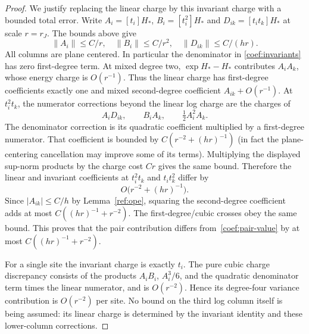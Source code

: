 \begin{proof}
We justify replacing the linear charge by this invariant charge with a
bounded total error.  Write $A_i=[t_i]H_*$, $B_i=[t_i^2]H_*$ and
$D_{ik}=[t_it_k]H_*$ at scale $r=r_J$.  The bounds above give
\[
 \|A_i\|\le C/r,\quad \|B_i\|\le C/r^2,\quad
 \|D_{ik}\|\le C/(hr).
\]
All columns are plane centered.  In particular the denominator in
\eqref{coef:invariants} has zero first-degree term.  At mixed degree two,
$\exp H_*-H_*$ contributes $A_iA_k$, whose energy charge is $O(r^{-1})$.
Thus the linear charge has first-degree coefficients exactly one and
mixed second-degree coefficient $A_{ik}+O(r^{-1})$.
At $t_i^2t_k$, the numerator corrections beyond the linear log charge
are the charges of
\[
 A_iD_{ik},\qquad B_iA_k,\qquad \tfrac12 A_i^2A_k.
\]
The denominator correction is its quadratic coefficient multiplied by a
first-degree numerator.  That coefficient is bounded by
$C(r^{-2}+(hr)^{-1})$ (in fact the plane-centering cancellation may improve
some of its terms).  Multiplying the displayed sup-norm products by the
charge cost $Cr$ gives the same bound.  Therefore the linear and invariant
coefficients at $t_i^2t_k$ and $t_it_k^2$ differ by
\begin{equation}\label{coef:cubic-error}
 O\bigl(r^{-2}+(hr)^{-1}\bigr).
\end{equation}
Since $|A_{ik}|\le C/h$ by Lemma~\ref{ref:ope}, squaring the
second-degree coefficient adds at most
$C((hr)^{-1}+r^{-2})$.  The first-degree/cubic crosses obey the same bound.
This proves that the pair contribution differs from~\eqref{coef:pair-value}
by at most $C((hr)^{-1}+r^{-2})$.

For a single site the invariant charge is exactly $t_i$.  The pure cubic
charge discrepancy consists of the products $A_iB_i$, $A_i^3/6$, and the
quadratic denominator term times the linear numerator, and is $O(r^{-2})$.
Hence its degree-four variance contribution is $O(r^{-2})$ per site.
No bound on the third log column itself is being assumed: its linear charge
is determined by the invariant identity and these lower-column corrections.


\end{proof}
